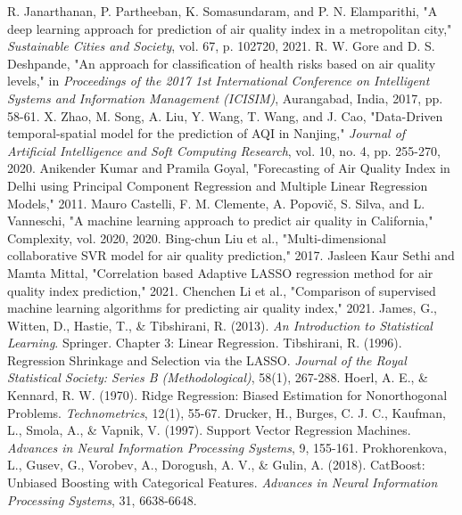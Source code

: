 \documentclass{book}
\numberwithin{equation}{section}
\numberwithin{figure}{section}
\begin{document}
\begin{thebibliography}{99}
    R. Janarthanan, P. Partheeban, K. Somasundaram, and P. N. Elamparithi, "A deep learning approach for prediction of air quality index in a metropolitan city," \textit{Sustainable Cities and Society}, vol. 67, p. 102720, 2021.
    R. W. Gore and D. S. Deshpande, "An approach for classification of health risks based on air quality levels," in \textit{Proceedings of the 2017 1st International Conference on Intelligent Systems and Information Management (ICISIM)}, Aurangabad, India, 2017, pp. 58-61.
    X. Zhao, M. Song, A. Liu, Y. Wang, T. Wang, and J. Cao, "Data-Driven temporal-spatial model for the prediction of AQI in Nanjing," \textit{Journal of Artificial Intelligence and Soft Computing Research}, vol. 10, no. 4, pp. 255-270, 2020.
    Anikender Kumar and Pramila Goyal, "Forecasting of Air Quality Index in Delhi using Principal Component Regression and Multiple Linear Regression Models," 2011.
    Mauro Castelli, F. M. Clemente, A. Popovič, S. Silva, and L. Vanneschi, "A machine learning approach to predict air quality in California," Complexity, vol. 2020, 2020.
    Bing-chun Liu et al., "Multi-dimensional collaborative SVR model for air quality prediction," 2017.
    Jasleen Kaur Sethi and Mamta Mittal, "Correlation based Adaptive LASSO regression method for air quality index prediction," 2021.
    Chenchen Li et al., "Comparison of supervised machine learning algorithms for predicting air quality index," 2021.
    James, G., Witten, D., Hastie, T., \& Tibshirani, R. (2013). \textit{An Introduction to Statistical Learning}. Springer. Chapter 3: Linear Regression.
    Tibshirani, R. (1996). Regression Shrinkage and Selection via the LASSO. 
    \textit{Journal of the Royal Statistical Society: Series B (Methodological)}, 58(1), 267-288.
    Hoerl, A. E., \& Kennard, R. W. (1970). Ridge Regression: Biased Estimation for Nonorthogonal Problems. \textit{Technometrics}, 12(1), 55-67.
    Drucker, H., Burges, C. J. C., Kaufman, L., Smola, A., \& Vapnik, V. (1997). Support Vector Regression Machines. \textit{Advances in Neural Information Processing Systems}, 9, 155-161.
    Prokhorenkova, L., Gusev, G., Vorobev, A., Dorogush, A. V., \& Gulin, A. (2018). CatBoost: Unbiased Boosting with Categorical Features. \textit{Advances in Neural Information Processing Systems}, 31, 6638-6648.  

\end{thebibliography}
\end{document}
